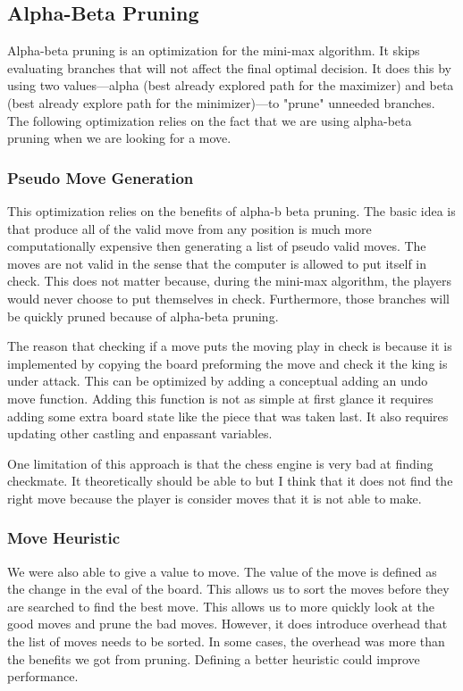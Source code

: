 \documentclass[sigconf]{acmart}
\begin{document}
\subsection{Alpha-Beta Pruning}
 Alpha-beta pruning is an optimization for the mini-max algorithm.
 It skips evaluating branches that will not affect the final optimal decision.
 It does this by using two values—alpha (best already explored path for the maximizer) and beta (best already explore path for the minimizer)—to "prune" unneeded branches.
 The following optimization relies on the fact that we are using alpha-beta pruning when we are looking for a move.

\subsubsection{Pseudo Move Generation}
This optimization relies on the benefits of alpha-b beta pruning.
The basic idea is that produce all of the valid move from any position is much more computationally expensive then generating a list of pseudo valid moves.
The moves are not valid in the sense that the computer is allowed to put itself in check.
This does not matter because, during the mini-max algorithm, the players would never choose to put themselves in check.
Furthermore, those branches will be quickly pruned because of alpha-beta pruning.

The reason that checking if a move puts the moving play in check is because it is implemented by copying the board preforming the move and check it the king is under attack.
This can be optimized by adding a conceptual adding an undo move function.
Adding this function is not as simple at first glance it requires adding some extra board state like the piece that was taken last.
It also requires updating other castling and enpassant variables.

One limitation of this approach is that the chess engine is very bad at finding checkmate.
It theoretically should be able to but I think that it does not find the right move because the player is consider moves that it is not able to make.

\subsubsection{Move Heuristic}
We were also able to give a value to move.
The value of the move is defined as the change in the eval of the board.
This allows us to sort the moves before they are searched to find the best move.
This allows us to more quickly look at the good moves and prune the bad moves.
However, it does introduce overhead that the list of moves needs to be sorted.
In some cases, the overhead was more than the benefits we got from pruning.
Defining a better heuristic could improve performance.
\end{document}
